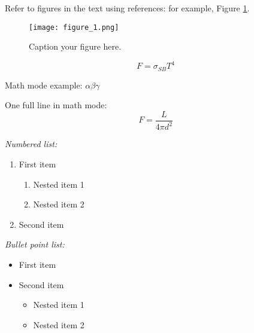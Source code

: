 \documentclass[12pt]{article}
\begin{document}
\begin{multicols}{2}
Refer to figures in the text using references: for example, Figure \ref{fig:my_plot}. 

\begin{figure}[H]
\centering
\texttt{[image: figure\_1.png]}
\caption{Caption your figure here.}
\label{fig:my_plot}
\end{figure}

\begin{equation}
F = \sigma_{SB} T^{4}
\label{eq:my_equation}
\end{equation}

Math mode example: $\alpha \beta \gamma$

One full line in math mode:
$$ F = \frac{L}{4\pi d^2} $$

\textit{Numbered list:} %

\begin{enumerate}
\item{First item}
\begin{enumerate}
\item{Nested item 1}
\item{Nested item 2}
\end{enumerate}
\item{Second item}
\end{enumerate}

\textit{Bullet point list:} 

\begin{itemize}
\item{First item}
\item{Second item}
\begin{itemize}
\item{Nested item 1}
\item {Nested item 2}
\end{itemize}
\end{itemize}

\end{multicols}
\end{document}
